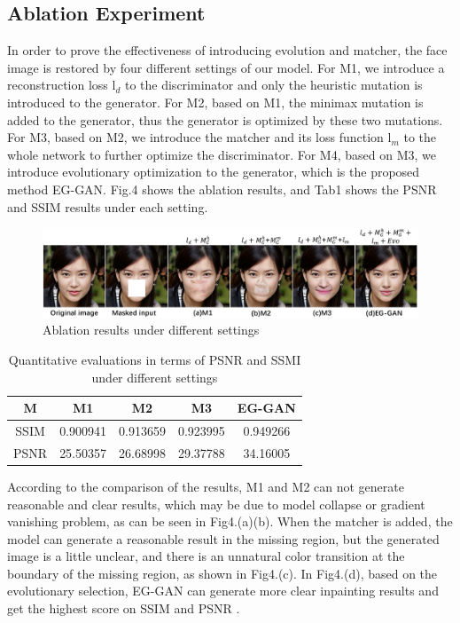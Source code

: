 \documentclass[journal]{IEEEtran}
\begin{document}
    \subsection{Ablation Experiment}
    In order to prove the effectiveness of introducing evolution and matcher, the face image is restored by four different settings of our model. For M1, we introduce a reconstruction loss l$_{d}$ to the discriminator and only the heuristic mutation is introduced to the generator. For M2, based on M1, the minimax mutation is added to the generator, thus the generator is optimized by these two mutations. For M3, based on M2, we introduce the matcher and its loss function l$_{m}$ to the whole network to further optimize the discriminator. For M4, based on M3, we introduce evolutionary optimization to the generator, which is the proposed method EG-GAN. Fig.4 shows the ablation results, and Tab1 shows the PSNR and SSIM results under each setting.
    \begin{figure}[htbp]
       \centering
       \includegraphics[width=0.8\linewidth]{figures/Fig4.png}
       \caption{Ablation results under different settings}
       \label{fig:Fig4}
    \end{figure}
    \begin{table}[htbp]
    \caption{Quantitative evaluations in terms of PSNR and SSMI under different settings}
	\centering
        \renewcommand{\arraystretch}{1.5}
        \begin{tabular}{|c|c|c|c|c|}
        \hline
        M&M1&M2&M3&EG-GAN\\
        \hline
        SSIM&0.900941&0.913659&0.923995&0.949266\\
        \hline
        PSNR&25.50357&26.68998&29.37788&34.16005\\
        \hline
        \end{tabular}
    \end{table}

    According to the comparison of the results, M1 and M2 can not generate reasonable and clear results, which may be due to model collapse or gradient vanishing problem, as can be seen in Fig4.(a)(b). When the matcher is added, the model can generate a reasonable result in the missing region, but the generated image is a little unclear, and there is an unnatural color transition at the boundary of the missing region, as shown in Fig4.(c). In Fig4.(d), based on the evolutionary selection, EG-GAN can generate more clear inpainting results and get the highest score on SSIM and PSNR .
\end{document}
